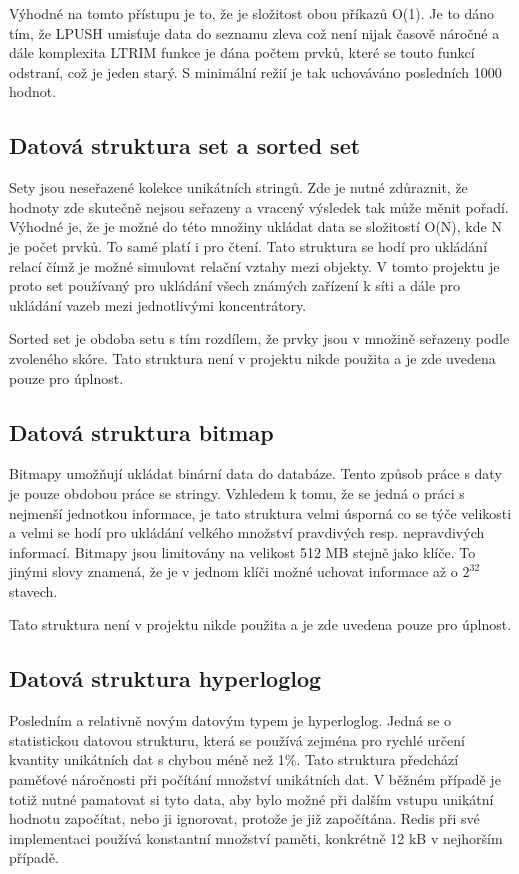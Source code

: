 Výhodné na tomto přístupu je to, že je složitost obou příkazů O(1). Je to dáno tím, že LPUSH umisťuje data do seznamu zleva což není nijak časově náročné a dále komplexita LTRIM funkce je dána počtem prvků, které se touto funkcí odstraní, což je jeden starý. S minimální režií je tak uchováváno posledních 1000 hodnot.

\subsection{Datová struktura set a sorted set}
Sety jsou neseřazené kolekce unikátních stringů. Zde je nutné zdůraznit, že hodnoty zde skutečně nejsou seřazeny a vracený výsledek tak může měnit pořadí. Výhodné je, že je možné do této množiny ukládat data se složitostí O(N), kde N je počet prvků. To samé platí i pro čtení. Tato struktura se hodí pro ukládání relací čímž je možné simulovat relační vztahy mezi objekty. V tomto projektu je proto set používaný pro ukládání všech známých zařízení k síti a dále pro ukládání vazeb mezi jednotlivými koncentrátory.

Sorted set je obdoba setu s tím rozdílem, že prvky jsou v množině seřazeny podle zvoleného skóre. Tato struktura není v projektu nikde použita a je zde uvedena pouze pro úplnost.

\subsection{Datová struktura bitmap}
Bitmapy umožňují ukládat binární data do databáze. Tento způsob práce s daty je pouze obdobou práce se stringy. Vzhledem k tomu, že se jedná o práci s nejmenší jednotkou informace, je tato struktura velmi úsporná co se týče velikosti a velmi se hodí pro ukládání velkého množství pravdivých resp. nepravdivých informací. Bitmapy jsou limitovány na velikost 512 MB stejně jako klíče. To jinými slovy znamená, že je v jednom klíči možné uchovat informace až o $2^{32}$ stavech.

Tato struktura není v projektu nikde použita a je zde uvedena pouze pro úplnost.

\subsection{Datová struktura hyperloglog}
Posledním a relativně novým datovým typem je hyperloglog. Jedná se o statistickou datovou strukturu, která se používá zejména pro rychlé určení kvantity unikátních dat s chybou méně než 1\%. Tato struktura předchází paměťové náročnosti při počítání množství unikátních dat. V běžném případě je totiž nutné pamatovat si tyto data, aby bylo možné při dalším vstupu unikátní hodnotu započítat, nebo ji ignorovat, protože je již započítána. Redis při své implementaci používá konstantní množství paměti, konkrétně 12 kB v nejhorším případě.

